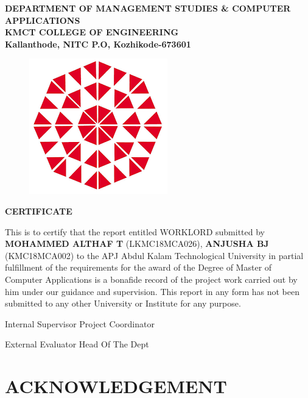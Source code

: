 \documentclass[a4paper,12pt]{report}
\begin{document}
\begin{center}
	
\textbf{
\vspace*{8pt}
DEPARTMENT OF MANAGEMENT STUDIES \& COMPUTER
\vspace*{8pt}
APPLICATIONS\\
KMCT COLLEGE OF ENGINEERING\\
\vspace*{8pt}
Kallanthode, NITC P.O, Kozhikode-673601
}

\begin{figure}[bph]
	\centering
	\includegraphics[width=0.3023\linewidth]{kmct}
	\label{fig:ksblogo}
\end{figure}
\end{center}

{\centering \bf \large
	CERTIFICATE\par
}
\vspace*{10pt}
This is to certify that the report entitled WORKLORD submitted
by {\bf MOHAMMED ALTHAF T} (LKMC18MCA026), {\bf ANJUSHA BJ}
(KMC18MCA002) to the APJ Abdul Kalam Technological University
in partial fulfillment of the requirements for the award of the Degree of Master of Computer
Applications is a bonafide record of the project work carried out by him under our guidance and
supervision. This report in any form has not been submitted to any other University or Institute for
any purpose.

\begin{center}\vspace*{20pt}
   Internal Supervisor \hspace*{0pt} \hfill  Project Coordinator
\end{center}

\begin{center}\vspace*{40pt}
   External Evaluator \hspace*{0pt} \hfill  Head Of The Dept
\end{center}
	
\pagebreak

\section*{\centering \bf \large ACKNOWLEDGEMENT}
\end{document}
